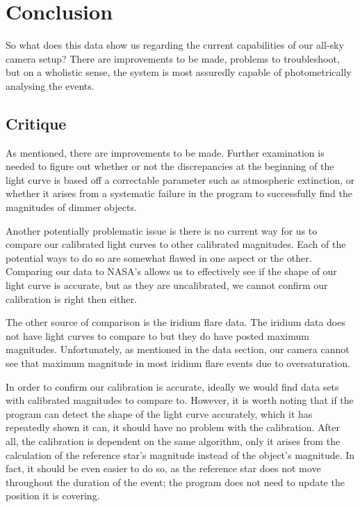 \chapter{Conclusion}

So what does this data show us regarding the current capabilities of our all-sky camera setup? There are improvements to be made, problems to troubleshoot, but on a wholistic sense, the system is most assuredly capable of photometrically analysing the events.

\section{Critique}

As mentioned, there are improvements to be made. Further examination is needed to figure out whether or not the discrepancies at the beginning of the light curve is based off a correctable parameter such as atmospheric extinction, or whether it arises from a systematic failure in the program to successfully find the magnitudes of dimmer objects.

Another potentially problematic issue is there is no current way for us to compare our calibrated light curves to other calibrated magnitudes. Each of the potential ways to do so are somewhat flawed in one aspect or the other. Comparing our data to NASA's allows us to effectively see if the shape of our light curve is accurate, but as they are uncalibrated, we cannot confirm our calibration is right then either.

The other source of comparison is the iridium flare data. The iridium data does not have light curves to compare to but they do have posted maximum magnitudes. Unfortunately, as mentioned in the data section, our camera cannot see that maximum magnitude in most iridium flare events due to oversaturation.

In order to confirm our calibration is accurate, ideally we would find data sets with calibrated magnitudes to compare to. However, it is worth noting that if the program can detect the shape of the light curve accurately, which it has repeatedly shown it can, it should have no problem with the calibration. After all, the calibration is dependent on the same algorithm, only it arises from the calculation of the reference star's magnitude instead of the object's magnitude. In fact, it should be even easier to do so, as the reference star does not move throughout the duration of the event; the program does not need to update the position it is covering.

